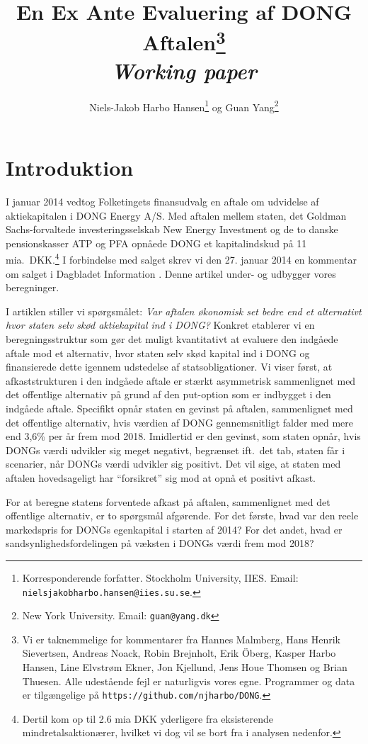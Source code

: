 \documentclass{article}
\title{En Ex Ante Evaluering af DONG Aftalen\thanks{Vi er taknemmelige for kommentarer fra Hannes Malmberg, Hans Henrik Sievertsen, Andreas Noack, Robin Brejnholt, Erik {\"O}berg, Kasper Harbo Hansen, Line Elvstrøm Ekner, Jon Kjellund,  Jens Houe Thomsen og Brian Thuesen. Alle udestående fejl er naturligvis vores egne.  Programmer og data er tilgængelige på \texttt{https://github.com/njharbo/DONG}.} \\ \emph{Working paper}}
\author{Niels-Jakob Harbo Hansen\thanks{Korresponderende forfatter. Stockholm University, IIES.  Email: \texttt{nielsjakobharbo.hansen@iies.su.se}. } \hspace{0.1 mm} og Guan Yang\thanks{New York University.  Email: \texttt{guan@yang.dk}}}
\begin{document}
\maketitle

\newpage

\section{Introduktion}


I januar 2014 vedtog Folketingets finansudvalg en aftale om udvidelse af aktiekapitalen i DONG Energy A/S. Med aftalen mellem staten, det Goldman Sachs-forvaltede investeringsselskab New Energy Investment og de to danske pensionskasser ATP og PFA opnåede DONG et kapitalindskud på 11 mia.\ DKK.\footnote{Dertil kom op til 2.6 mia DKK yderligere fra eksisterende mindretalsaktionærer, hvilket vi dog vil se bort fra i analysen nedenfor.} I forbindelse med salget skrev vi den 27. januar 2014 en kommentar om salget i Dagbladet Information \citep{Hansen2014}. Denne artikel under- og udbygger vores beregninger.

I artiklen stiller vi spørgsmålet: \emph{Var aftalen økonomisk set bedre end et alternativt hvor staten selv skød aktiekapital ind i DONG?} Konkret etablerer vi en beregningsstruktur som gør det muligt kvantitativt at evaluere den indgåede aftale mod et alternativ, hvor staten selv skød kapital ind i DONG og finansierede dette igennem udstedelse af statsobligationer. Vi viser først, at afkaststrukturen i den indgåede aftale er stærkt asymmetrisk sammenlignet med det offentlige alternativ på grund af den put-option som er indbygget i den indgåede aftale. Specifikt opnår staten en gevinst på aftalen, sammenlignet med det offentlige alternativ, hvis værdien af DONG gennemsnitligt falder med mere end 3,6\% per år frem mod 2018. Imidlertid er den gevinst, som staten opnår, hvis DONGs værdi udvikler sig meget negativt, begrænset ift.\ det tab, staten får i scenarier, når DONGs værdi udvikler sig positivt. Det vil sige, at staten med aftalen hovedsageligt har \enquote{forsikret} sig mod at opnå et positivt afkast. 

For at beregne statens forventede afkast på aftalen, sammenlignet med det offentlige alternativ, er to spørgsmål afgørende. For det første, hvad var den reele markedspris for DONGs egenkapital i starten af 2014? For det andet, hvad er sandsynlighedsfordelingen på væksten i DONGs værdi frem mod 2018? 
\end{document}
